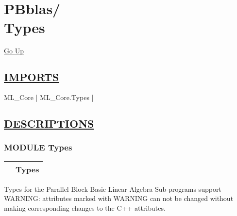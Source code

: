 \chapter*{\color{headfile}
{\large PBblas\slash\hspace{0pt}}
 \\
Types
}
\hypertarget{ecldoc:toc:PBblas.Types}{}
\hyperlink{ecldoc:toc:root/PBblas}{Go Up}

\section*{\underline{\textsf{IMPORTS}}}
\begin{doublespace}
{\large
ML\_Core |
ML\_Core.Types |
}
\end{doublespace}

\section*{\underline{\textsf{DESCRIPTIONS}}}
\subsection*{\textsf{\colorbox{headtoc}{\color{white} MODULE}
Types}}

\hypertarget{ecldoc:PBblas.Types}{}

{\renewcommand{\arraystretch}{1.5}
\begin{tabularx}{\textwidth}{|>{\raggedright\arraybackslash}l|X|}
\hline
\hspace{0pt}\mytexttt{\color{red} } & \textbf{Types} \\
\hline
\end{tabularx}
}

\par





Types for the Parallel Block Basic Linear Algebra Sub-programs support WARNING: attributes marked with WARNING can not be changed without making corresponding changes to the C++ attributes.







